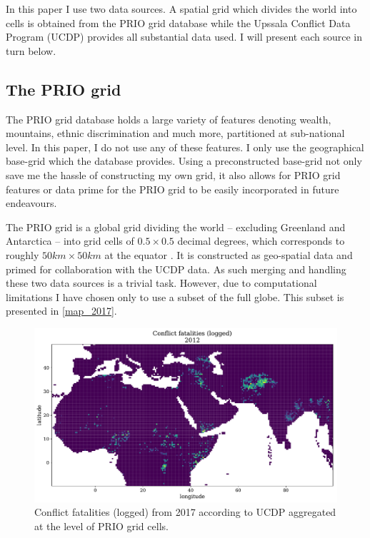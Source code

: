 \documentclass[a4paper]{article}
\begin{document}
In this paper I use two data sources. A spatial grid which divides the world into cells is obtained from the PRIO grid database \citep{Tollefsen_2012} while the Upssala Conflict Data Program (UCDP) \citep{Sundberg_2013, Croicu_Sundberg_2017} provides all substantial data used. I will present each source in turn below.\par

\subsection{The PRIO grid}

The PRIO grid database holds a large variety of features denoting wealth, mountains, ethnic discrimination and much more, partitioned at sub-national level. In this paper, I do not use any of these features. I only use the geographical base-grid which the database provides. Using a preconstructed base-grid not only save me the hassle of constructing my own grid, it also allows for PRIO grid features or data prime for the PRIO grid to be easily incorporated in future endeavours.\par

The PRIO grid is a global grid dividing the world -- excluding Greenland and Antarctica -- into grid cells of $0.5 \times 0.5$ decimal degrees, which corresponds to roughly $50km\times50km$ at the equator \citep[367]{Tollefsen_2012}. It is constructed as geo-spatial data and primed for collaboration with the UCDP data. As such merging and handling these two data sources is a trivial task. However, due to computational limitations I have chosen only to use a subset of the full globe. This subset is presented in \autoref{map_2017}.\par

\begin{figure}[!htb]
	\centering
	\includegraphics[scale=0.5]{log_best_2012_samples.pdf}
    \caption{\footnotesize{Conflict fatalities (logged) from 2017 according to UCDP aggregated at the level of PRIO grid cells.}}\label{map_2017}
\end{figure}
\end{document}
